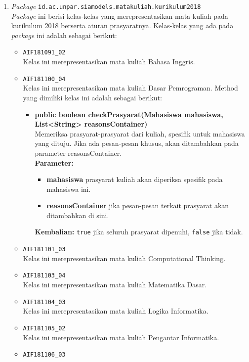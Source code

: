 \begin{enumerate}
	\item \textit{Package} \texttt{id.ac.unpar.siamodels.matakuliah.kurikulum2018} \\
	\textit{Package} ini berisi kelas-kelas yang merepresentasikan mata kuliah pada kurikulum 2018 berserta aturan prasyaratnya. Kelas-kelas yang ada pada \textit{package} ini adalah sebagai berikut:
	\begin{itemize}
		\item \texttt{AIF181091\_02} \\
		Kelas ini merepresentasikan mata kuliah Bahasa Inggris.
		\item \texttt{AIF181100\_04} \\
		Kelas ini merepresentasikan mata kuliah Dasar Pemrograman. Method yang dimiliki kelas ini adalah sebagai berikut: 
		\begin{itemize}
			\item \textbf{public boolean checkPrasyarat(Mahasiswa mahasiswa, List<String> reasonsContainer)}\\
			Memeriksa prasyarat-prasyarat dari kuliah, spesifik untuk mahasiswa yang dituju. Jika ada pesan-pesan khusus, akan ditambahkan pada parameter reasonsContainer.\\
			\textbf{Parameter:}
			\begin{itemize}
				\item \textbf{mahasiswa} prasyarat kuliah akan diperiksa spesifik pada mahasiswa ini.
				\item \textbf{reasonsContainer} jika pesan-pesan terkait prasyarat akan ditambahkan di sini.
			\end{itemize}
			\textbf{Kembalian:} \texttt{true} jika seluruh prasyarat dipenuhi, \texttt{false} jika tidak.
		\end{itemize}
		\item \texttt{AIF181101\_03} \\
		Kelas ini merepresentasikan mata kuliah Computational Thinking.
		\item \texttt{AIF181103\_04} \\
		Kelas ini merepresentasikan mata kuliah Matematika Dasar.
		\item \texttt{AIF181104\_03} \\
		Kelas ini merepresentasikan mata kuliah Logika Informatika.
		\item \texttt{AIF181105\_02} \\
		Kelas ini merepresentasikan mata kuliah Pengantar Informatika.
		\item \texttt{AIF181106\_03} \\

\end{itemize}
\end{enumerate}
